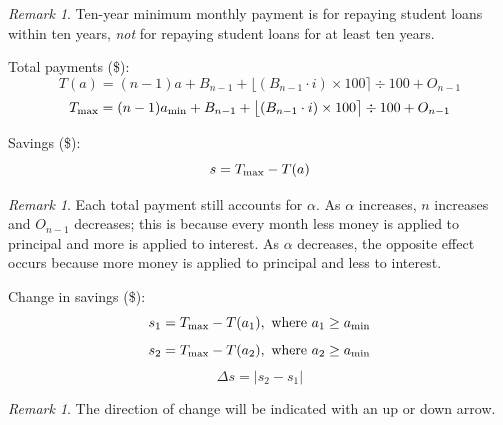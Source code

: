 \documentclass[12pt,letterpaper,oneside]{article}
\theoremstyle{remark} %
\newtheorem{remark}[theorem]{Remark}
\begin{document}
	\normalsize
	\begin{remark}
	Ten-year minimum monthly payment is for repaying student loans within ten years, \textit{not} for repaying student loans for at least ten years.
	\end{remark}

	\vspace{12pt}
	\setlength\parindent{0pt} Total payments (\$):
	$$T(a)=(n-1)a+B_{n-1}+\big\lfloor{\left(B_{n-1}\cdot i\right)\times 100}\big\rceil\div 100+O_{n-1}$$
	$$T_{\rm{max}}=(n-1)a_{\rm{min}}+B_{n-1}+\big\lfloor{\left(B_{n-1}\cdot i\right)\times 100}\big\rceil\div 100+O_{n-1}$$

	\vspace{12pt}
	\setlength\parindent{0pt} Savings (\$):
	$$s=T_{\rm{max}}-T(a)$$

	\vspace{12pt}
	\begin{remark}
	Each total payment still accounts for $\alpha$. As $\alpha$ increases, $n$ increases and $O_{n-1}$ decreases; this is because every month less money is applied to principal and more is applied to interest. As $\alpha$ decreases, the opposite effect occurs because more money is applied to principal and less to interest.
	\end{remark}

	\vspace{12pt}
	\setlength\parindent{0pt} Change in savings (\$):
	$$s_{1}=T_{\rm{max}}-T(a_{1}),\mbox{ where }a_{1}\geq a_{\rm{min}}$$
	$$s_{2}=T_{\rm{max}}-T(a_{2}),\mbox{ where }a_{2}\geq a_{\rm{min}}$$
	$$\Delta s=\left|s_{2}-s_{1}\right|$$

	\vspace{12pt}
	\begin{remark}
	The direction of change will be indicated with an up or down arrow.
	\end{remark}
\end{document}
